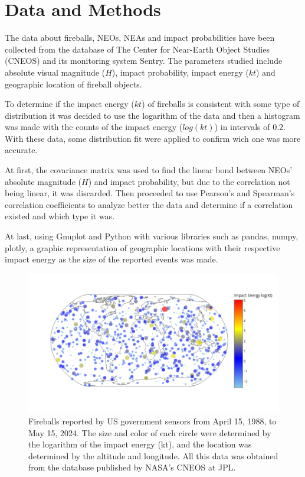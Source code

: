 \documentclass[
	a4paper, %
	10pt, %
	unnumberedsections, %
	twoside, %
]{LTJournalArticle}
\begin{document}
\section{Data and Methods}

The data about fireballs, NEOs, NEAs and impact probabilities have been collected from the database of
The Center for Near-Earth Object Studies (CNEOS) and its monitoring system Sentry. The parameters
studied include absolute visual magnitude ($H$), impact probability, impact energy ($kt$) and
geographic location of fireball objects.


To determine if the impact energy ($kt$) of fireballs is consistent with some type of distribution it
was decided to use the logarithm of the data and then a histogram was made with the counts of the
impact energy ($log(kt)$) in intervals of $0.2$. With these data, some distribution fit were applied
to confirm wich one was more accurate.

At first, the covariance matrix was used to find the linear bond between NEOs' absolute magnitude ($H$)
and impact probability, but due to the correlation not being linear, it was discarded. Then proceeded
to use Pearson's and Spearman's correlation coefficients to analyze better the data and determine if a
correlation existed and which type it was.

At last, using Gnuplot and Python with various libraries such as pandas, numpy, plotly, a graphic
representation of geographic locations with their respective impact energy as the size of the reported
events was made.

\begin{figure} %
	\includegraphics[width=\linewidth]{fireballs.png}
	\caption{Fireballs reported by US government sensors from April 15, 1988, to May 15, 2024. The size and color of each circle were determined by the logarithm of the impact energy (kt), and the location was determined by the altitude and longitude. All this data was obtained from the database published by NASA’s CNEOS at JPL.}
	\label{fig:fireballs}
\end{figure}
\end{document}
